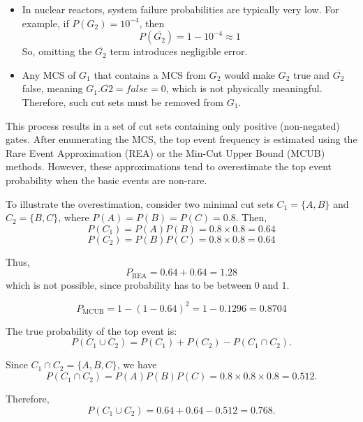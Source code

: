 \begin{itemize}
\item In nuclear reactors, system failure probabilities are typically very low. For example, if $P(G_2) = 10^{-4}$, then $$P(\overline{G_2}) = 1 - 10^{-4} \approx 1$$ So, omitting the $\overline{G_2}$ term introduces negligible error.
\item Any MCS of $G_1$ that contains a MCS from $G_2$ would make $G_2$ true and $\overline{G_2}$ false, meaning $G_1.\overline{G2}=false=0$, which is not physically meaningful. Therefore, such cut sets must be removed from $G_1$.
\end{itemize}

This process results in a set of cut sets containing only positive (non-negated) gates. After enumerating the MCS, the top event frequency is estimated using the Rare Event Approximation (REA) or the Min-Cut Upper Bound (MCUB) methods. However, these approximations tend to overestimate the top event probability when the basic events are non-rare.

To illustrate the overestimation, consider two minimal cut sets $C_1 = \{A, B\}$ and $C_2 = \{B, C\}$, where $P(A) = P(B) = P(C) = 0.8$. Then,
\begin{equation}
P(C_1) = P(A)P(B) = 0.8 \times 0.8 = 0.64
\end{equation}
\begin{equation}
P(C_2) = P(B)P(C) = 0.8 \times 0.8 = 0.64
\end{equation}

Thus,
\begin{equation}
P_{\mathrm{REA}} = 0.64 + 0.64 = 1.28
\end{equation}
which is not possible, since probability has to be between 0 and 1.

\begin{equation}
P_{\mathrm{MCUB}} = 1 - (1-0.64)^2 = 1 - 0.1296 = 0.8704
\end{equation}

The true probability of the top event is:
\begin{equation}
P(C_1 \cup C_2) = P(C_1) + P(C_2) - P(C_1 \cap C_2).
\end{equation}

Since $C_1 \cap C_2 = \{A, B, C\}$, we have
\begin{equation}
P(C_1 \cap C_2) = P(A)P(B)P(C) = 0.8 \times 0.8 \times 0.8 = 0.512.
\end{equation}

Therefore,
\begin{equation}
P(C_1 \cup C_2) = 0.64 + 0.64 - 0.512 = 0.768.
\end{equation}

